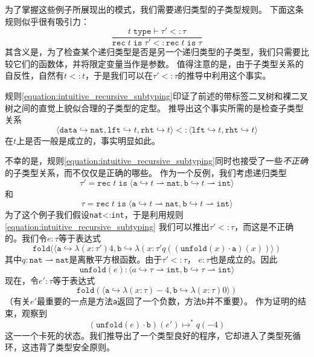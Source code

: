 为了掌握这些例子所展现出的模式，我们需要递归类型的子类型规则。
下面这条规则似乎很有吸引力：
\begin{equation}\label{equation:intuitive_recursive_subtyping}
    \frac{t\;\texttt{type}\vdash\tau{'}<:\tau}{\texttt{rec}\;t\;\texttt{is}\;\tau{'}<:\texttt{rec}\;t\;\texttt{is}\;\tau}
\end{equation}
其含义是，为了检查某个递归类型是否是另一个递归类型的子类型，我们只需要比较它们的函数体，并将限定变量当作是参数。
值得注意的是，由于子类型关系的自反性，自然有$t<:t$，于是我们可以在$\tau{'}<:\tau$的推导中利用这个事实。

规则\ref{equation:intuitive_recursive_subtyping}印证了前述的带标签二叉树和裸二叉树之间的直觉上貌似合理的子类型的定型。
推导出这个事实所需的是检查子类型关系
$$
    \langle \texttt{data} \hookrightarrow \texttt{nat},\texttt{lft} \hookrightarrow t,\texttt{rht} \hookrightarrow t \rangle <:\langle \texttt{lft}\hookrightarrow t,\texttt{rht} \hookrightarrow t \rangle
$$
在$t$上是否一般是成立的，事实明显如此。

不幸的是，规则\ref{equation:intuitive_recursive_subtyping}同时也接受了一些\textit{不正确}的子类型关系，而不仅仅是正确的哪些。
作为一个反例，我们考虑递归类型
$$
    \tau {'} = \texttt{rec}\;t\;\texttt{is}\;\langle\texttt{a}\hookrightarrow t \rightharpoonup \texttt{nat},\texttt{b} \hookrightarrow t \rightharpoonup \texttt{int}\rangle
$$
和
$$
    \tau  = \texttt{rec}\;t\;\texttt{is}\;\langle\texttt{a}\hookrightarrow t \rightharpoonup \texttt{nat},\texttt{b} \hookrightarrow t \rightharpoonup \texttt{int}\rangle
$$
为了这个例子我们假设\texttt{nat}<:\texttt{int}，于是利用规则\ref{equation:intuitive_recursive_subtyping}
我们可以推出$\tau{'}<:\tau$，而这是不正确的。我们令$e:\tau$等于表达式
$$
    \texttt{fold}(\langle \texttt{a} \hookrightarrow \lambda(x:\tau{'})4,\texttt{b} \hookrightarrow \lambda(x:\tau{'}q((\texttt{unfold}(x)\cdot\texttt{a})(x))  \rangle)
$$
其中$q:\texttt{nat}\rightharpoonup \texttt{nat}$是离散平方根函数。由于$\tau{'}<:\tau$，
$e:\tau$也是成立的。因此
$$
    \texttt{unfold}(e):\langle a \hookrightarrow \tau \rightharpoonup \texttt{int},\texttt{b} \hookrightarrow \tau \rightharpoonup \texttt{int} \rangle 
$$
现在，令$e{'}:\tau$等于表达式
$$
    \texttt{fold}(\langle \texttt{a} \hookrightarrow \lambda (x:\tau)-4,\texttt{b}\hookrightarrow \lambda (x:\tau)0 \rangle)
$$
（有关$e{'}$最重要的一点是方法\texttt{a}返回了一个负数，方法\texttt{b}并不重要）。
作为证明的结束，观察到
$$
    (\texttt{unfold}(e)\cdot \texttt{b})(e{'}) \longmapsto^* q(-4)
$$
这一一个卡死的状态。我们推导出了一个类型良好的程序，它却进入了类型死循环，这违背了类型安全原则。

